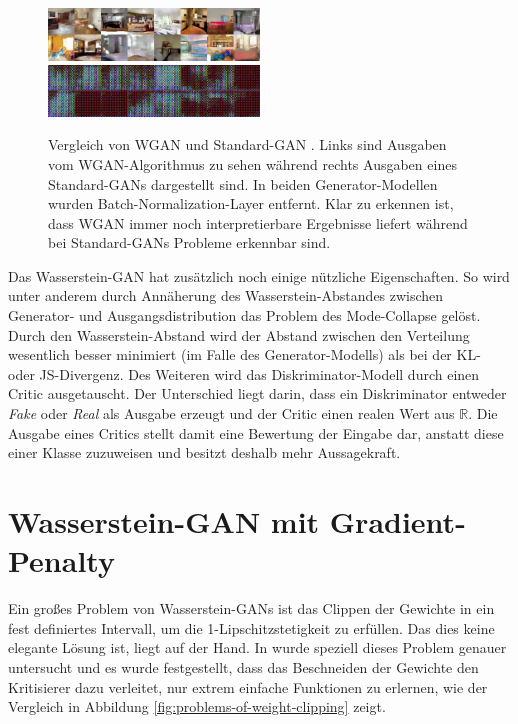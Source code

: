 \documentclass{hsflensburg}
\begin{document}
  \begin{figure}
    \includegraphics[width=0.5\textwidth]{images/image-022.png}
    \includegraphics[width=0.5\textwidth]{images/image-024.png}
    \caption{Vergleich von WGAN und Standard-GAN \cite{arjovsky2017wasserstein}.
      Links sind Ausgaben vom WGAN-Algorithmus zu sehen während rechts Ausgaben
      eines Standard-GANs dargestellt sind. In beiden Generator-Modellen wurden
      Batch-Normalization-Layer entfernt. Klar zu erkennen ist, dass WGAN immer
      noch interpretierbare Ergebnisse liefert während bei Standard-GANs Probleme
      erkennbar sind.}
    \label{fig:wgan-gan-no-batchnorm}
  \end{figure}

  Das Wasserstein-GAN hat zusätzlich noch einige nützliche Eigenschaften. So
  wird unter anderem durch Annäherung des Wasserstein-Abstandes zwischen
  Generator- und Ausgangsdistribution das Problem des Mode-Collapse gelöst.
  Durch den Wasserstein-Abstand wird der Abstand zwischen den Verteilung
  wesentlich besser minimiert (im Falle des Generator-Modells) als bei der KL-
  oder JS-Divergenz.  Des Weiteren wird das Diskriminator-Modell durch einen
  Critic ausgetauscht.  Der Unterschied liegt darin, dass ein Diskriminator
  entweder \textit{Fake} oder \textit{Real} als Ausgabe erzeugt und der Critic
  einen realen Wert aus $\mathbb{R}$. Die Ausgabe eines Critics stellt damit
  eine Bewertung der Eingabe dar, anstatt diese einer Klasse zuzuweisen und
  besitzt deshalb mehr Aussagekraft.

  \section{Wasserstein-GAN mit Gradient-Penalty}
  Ein großes Problem von Wasserstein-GANs ist das Clippen der Gewichte in ein
  fest definiertes Intervall, um die 1-Lipschitzstetigkeit zu erfüllen. Das dies
  keine elegante Lösung ist, liegt auf der Hand. In \cite{gulrajani2017improved}
  wurde speziell dieses Problem genauer untersucht und es wurde festgestellt,
  dass das Beschneiden der Gewichte den Kritisierer dazu verleitet, nur extrem
  einfache Funktionen zu erlernen, wie der Vergleich in Abbildung
  \ref{fig:problems-of-weight-clipping} zeigt. 
\end{document}
